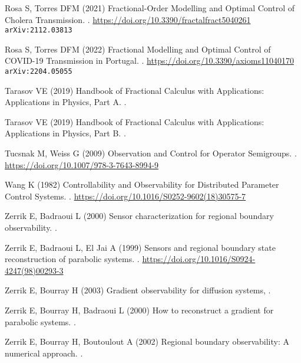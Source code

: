 \documentclass{article}
\begin{document}
\begin{thebibliography}{xx}
Rosa S, Torres DFM (2021)
\newblock Fractional-Order Modelling and Optimal Control of Cholera Transmission.
.
\url{https://doi.org/10.3390/fractalfract5040261}
{\tt arXiv:2112.03813}

Rosa S, Torres DFM (2022)
\newblock Fractional Modelling and Optimal Control of COVID-19 Transmission in Portugal.
.
\url{https://doi.org/10.3390/axioms11040170}
{\tt arXiv:2204.05055}

Tarasov VE (2019)
\newblock Handbook of Fractional Calculus with Applications: 
Applications in Physics, Part A. 
.

Tarasov VE (2019) 
\newblock Handbook of Fractional Calculus with Applications: 
Applications in Physics, Part B. 
.

Tucsnak M, Weiss G (2009) 
\newblock Observation and Control for Operator Semigroups.
. 
\url{https://doi.org/10.1007/978-3-7643-8994-9}

Wang K (1982) 
\newblock Controllability and Observability 
for Distributed Parameter Control Systems.
.
\url{https://doi.org/10.1016/S0252-9602(18)30575-7}

Zerrik E, Badraoui L (2000)
\newblock Sensor characterization for regional boundary observability.
.

Zerrik E, Badraoui L, El Jai A (1999)
\newblock Sensors and regional boundary state reconstruction of parabolic systems.
.
\url{https://doi.org/10.1016/S0924-4247(98)00293-3}

Zerrik E, Bourray H (2003) 
\newblock Gradient observability for diffusion systems,
.

Zerrik E, Bourray H, Badraoui L (2000) 
\newblock How to reconstruct a gradient for parabolic systems.
.

Zerrik E, Bourray H, Boutoulout A (2002)
\newblock Regional boundary observability: A numerical approach.
.


\end{thebibliography}
\end{document}
